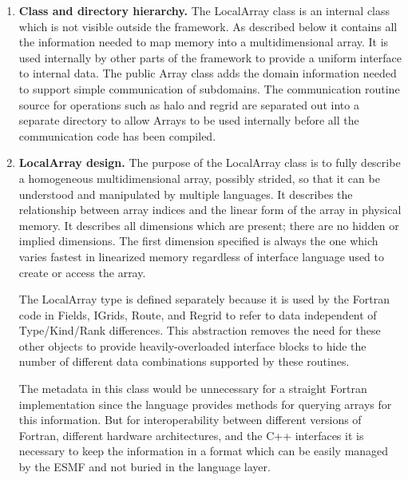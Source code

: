

\begin{enumerate}

\item{\bf Class and directory hierarchy.}
The LocalArray class is an internal class which is not 
visible outside the framework.
As described below it contains all the information needed to
map memory into a multidimensional array.  It is used internally
by other parts of the framework to provide a uniform interface to 
internal data.  The public Array class
adds the domain information needed to support simple communication of
subdomains.  The communication routine source for operations such
as halo and regrid are separated out into a separate directory 
to allow Arrays to be used internally before all the 
communication code has been compiled.

\item{\bf LocalArray design.}
The purpose of the LocalArray class is to fully describe 
a homogeneous
multidimensional array, possibly strided, so that it can be understood
and manipulated by multiple languages.   It describes the
relationship between array indices and the linear form of the array
in physical memory.  It describes all dimensions which are present;
there are no hidden or implied dimensions.  The first dimension specified
is always the one which varies fastest in linearized memory regardless of
interface language used to create or access the array.

The LocalArray type is defined separately because it is used by the
Fortran code in Fields, IGrids, Route, and Regrid to refer to data 
independent of Type/Kind/Rank differences.  This abstraction removes
the need for these other objects to provide
heavily-overloaded interface blocks to hide the number of
different data combinations supported by these routines.

The metadata in this class would be unnecessary for a straight
Fortran implementation since the language provides methods for querying
arrays for this information.  But for interoperability between different
versions of Fortran, different hardware architectures, 
and the C++ interfaces
it is necessary to keep the information in a format which can be
easily managed by the ESMF and not buried in the language layer.



\end{enumerate}
